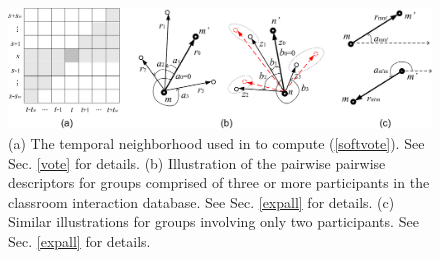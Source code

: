 \begin{figure}[t]
\vspace{-5pt}
\begin{center}
\includegraphics[scale=1.2]{all_illu.png}
\end{center}
\caption{(a) The temporal neighborhood used in to compute (\ref{softvote}). See Sec. \ref{vote} for details. (b) Illustration of the pairwise pairwise descriptors for groups comprised of three or more participants in the classroom interaction database. See Sec. \ref{expall} for details. (c) Similar illustrations for groups involving only two participants. See Sec. \ref{expall} for details.}
\label{all_illu}
\vspace{-5pt}
\end{figure}

